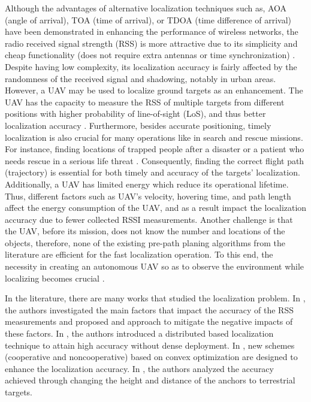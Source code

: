 \documentclass[journal,twocolumn]{IEEEtran}
\begin{document}
Although the advantages of alternative localization techniques such as, AOA (angle of arrival), TOA (time of arrival), or TDOA (time difference of arrival) have been demonstrated in enhancing the performance of wireless networks, the radio received signal strength (RSS) is more attractive due to its simplicity and cheap functionality (does not require extra antennas or time synchronization) \cite{zanella2016best}. Despite having low complexity, its localization accuracy is fairly affected by the randomness of the received signal and shadowing, notably in urban areas. However, a UAV may be used to localize ground targets as an enhancement. The UAV has the capacity to measure the RSS of multiple targets from different positions with higher probability of line-of-sight (LoS), and thus better localization accuracy \cite{al2014modeling}.
Furthermore, besides accurate positioning, timely localization is also crucial for many operations like in search and rescue missions. For instance, finding locations
of trapped people after a disaster or a patient who needs rescue in a serious life threat \cite{wang2017guideloc}. Consequently, finding the correct flight path (trajectory) is essential for both timely and accuracy of the targets’ localization. Additionally, a UAV has limited energy which reduce its operational lifetime. Thus, different factors such as UAV’s velocity, hovering time, and path length affect the energy consumption of the UAV, and as a result impact the localization accuracy due to fewer collected RSSI measurements. Another challenge is that the UAV, before its mission, does not know the number and locations of the objects, therefore, none of the existing pre-path planing algorithms from the literature are efficient for the fast localization operation. To this end, the necessity in creating an autonomous UAV so as to observe the environment while localizing becomes crucial \cite{tomic2012toward}.

In the literature, there are many works that studied the localization problem. In \cite{zanella2016best}, the authors investigated the main factors that impact the accuracy of the RSS measurements and proposed and approach to mitigate the negative impacts of these factors. In \cite{liu2015rss}, the authors introduced a distributed based localization technique to attain high accuracy without dense deployment. In \cite{tomic2014rss}, new schemes (cooperative and noncooperative) based on convex optimization are designed to enhance the localization accuracy. In \cite{stoyanova2014rss}, the authors analyzed the accuracy achieved through changing the height and distance of the anchors to terrestrial targets.
\end{document}
